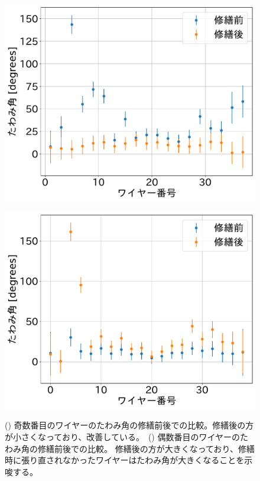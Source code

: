\documentclass[../../main.tex]{subfiles}
\begin{document}
\begin{figure}[H]
    \begin{minipage}[b]{0.5\hsize}
        \centering
        \includegraphics[width=1.0\textwidth]{wiresag_swg/swg_sag_angle_odd_comparison.pdf}
        \subcaption{}
        \label{fig:wiresag_swg_sag_odd_comparison}
    \end{minipage}
    \begin{minipage}[b]{0.5\hsize}
        \centering
        \includegraphics[width=1.0\textwidth]{wiresag_swg/swg_sag_angle_even_comparison.pdf}
        \subcaption{}
        \label{fig:wiresag_swg_sag_even_comparison}
    \end{minipage}
    \caption{() 奇数番目のワイヤーのたわみ角の修繕前後での比較。修繕後の方が小さくなっており、改善している。\ 
             () 偶数番目のワイヤーのたわみ角の修繕前後での比較。
             修繕後の方が大きくなっており、修繕時に張り直されなかったワイヤーはたわみ角が大きくなることを示唆する。
             }
    \label{fig:wiresag_swg_even_odd_repair_comparison}
\end{figure}
\end{document}
